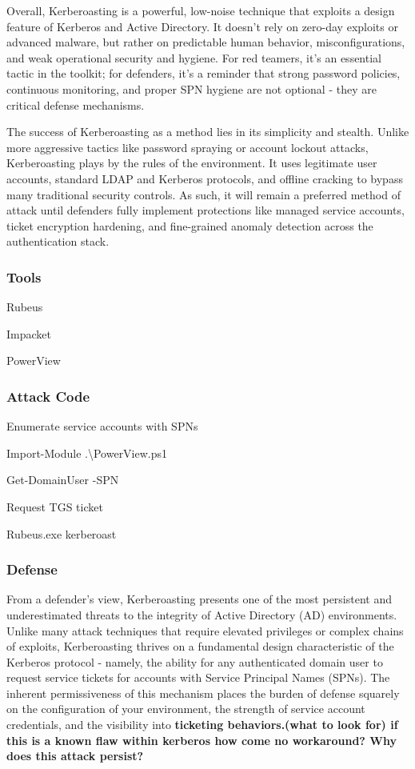Overall, Kerberoasting is a powerful, low-noise technique that exploits a design feature of Kerberos and Active Directory. It doesn’t rely on zero-day exploits or advanced malware, but rather on predictable human behavior, misconfigurations, and weak operational security and hygiene. For red teamers, it’s an essential tactic in the toolkit; for defenders, it’s a reminder that strong password policies, continuous monitoring, and proper SPN hygiene are not optional - they are critical defense mechanisms.

The success of Kerberoasting as a method lies in its simplicity and stealth. Unlike more aggressive tactics like password spraying or account lockout attacks, Kerberoasting plays by the rules of the environment. It uses legitimate user accounts, standard LDAP and Kerberos protocols, and offline cracking to bypass many traditional security controls. As such, it will remain a preferred method of attack until defenders fully implement protections like managed service accounts, ticket encryption hardening, and fine-grained anomaly detection across the authentication stack.

\subsubsection{\textbf{Tools}}

Rubeus

Impacket

PowerView

\subsubsection{\textbf{Attack Code}}

Enumerate service accounts with SPNs

Import-Module .\textbackslash{}PowerView.ps1

Get-DomainUser -SPN

Request TGS ticket

Rubeus.exe kerberoast

\subsubsection{\textbf{Defense}}

From a defender’s view, Kerberoasting presents one of the most persistent and underestimated threats to the integrity of Active Directory (AD) environments. Unlike many attack techniques that require elevated privileges or complex chains of exploits, Kerberoasting thrives on a fundamental design characteristic of the Kerberos protocol - namely, the ability for any authenticated domain user to request service tickets for accounts with Service Principal Names (SPNs). The inherent permissiveness of this mechanism places the burden of defense squarely on the configuration of your environment, the strength of service account credentials, and the visibility into \textbf{ticketing behaviors.(what to look for) if this is a known flaw within kerberos how come no workaround? Why does this attack persist?}

